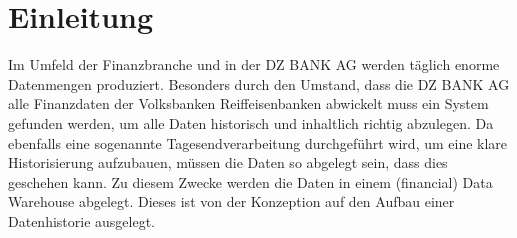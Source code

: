 \chapter{Einleitung}
Im Umfeld der Finanzbranche und in der DZ BANK AG werden täglich enorme Datenmengen produziert. Besonders durch den Umstand, dass die DZ BANK AG alle Finanzdaten der Volksbanken Reiffeisenbanken abwickelt muss ein System gefunden werden, um alle Daten historisch und inhaltlich richtig abzulegen. Da ebenfalls eine sogenannte Tagesendverarbeitung durchgeführt wird, um eine klare Historisierung aufzubauen, müssen die Daten so abgelegt sein, dass dies geschehen kann. Zu diesem Zwecke werden die Daten in einem (financial) Data Warehouse abgelegt. Dieses ist von der Konzeption auf den Aufbau einer Datenhistorie ausgelegt. 
